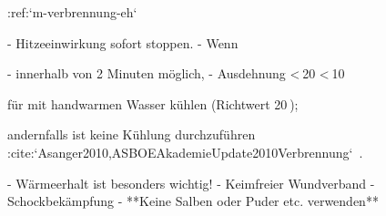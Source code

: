 :ref:`m-verbrennung-eh`
\begin{itemize}
  -   Hitzeeinwirkung sofort stoppen.
  -   Wenn 
  \begin{itemize}
    -   innerhalb von 2 Minuten
  möglich,
    -   Ausdehnung < 20%
    < 10%
  \end{itemize}  für  mit
    handwarmen Wasser kühlen (Richtwert 20 \DegC); 
    
    andernfalls ist keine Kühlung durchzuführen
 :cite:`Asanger2010,ASBOEAkademieUpdate2010Verbrennung`\ .
  
  -   Wärmeerhalt ist besonders wichtig!
  -   Keimfreier Wundverband
  -   Schockbekämpfung
  -   **Keine Salben oder Puder etc. verwenden**
\end{itemize}